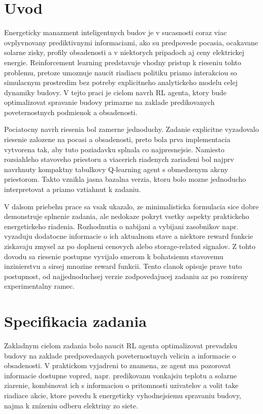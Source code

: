 \documentclass[conference]{IEEEtran}
\begin{document}
\section{Uvod}
Energeticky manazment inteligentnych budov je v sucasnosti coraz viac ovplyvnovany prediktivnymi informaciami, ako su predpovede pocasia, ocakavane solarne zisky, profily obsadenosti a v niektorych pripadoch aj ceny elektrickej energie. Reinforcement learning predstavuje vhodny pristup k rieseniu tohto problemu, pretoze umoznuje naucit riadiacu politiku priamo interakciou so simulacnym prostredim bez potreby explicitneho analytickeho modelu celej dynamiky budovy. V tejto praci je cielom navrh RL agenta, ktory bude optimalizovat spravanie budovy primarne na zaklade predikovanych poveternostnych podmienok a obsadenosti.

Pociatocny navrh riesenia bol zamerne jednoduchy. Zadanie explicitne vyzadovalo riesenie zalozene na pocasi a obsadenosti, preto bola prva implementacia vytvorena tak, aby tuto poziadavku splnala co najpresnejsie. Namiesto rozsiahleho stavoveho priestoru a viacerich riadenych zariadeni bol najprv navrhnuty kompaktny tabulkovy Q-learning agent s obmedzenym akcny priestorom. Takto vznikla jasna bazalna verzia, ktoru bolo mozne jednoducho interpretovat a priamo vztiahnut k zadaniu.

V dalsom priebehu prace sa vsak ukazalo, ze minimalisticka formulacia sice dobre demonstruje splnenie zadania, ale nedokaze pokryt vsetky aspekty praktickeho energetickeho riadenia. Rozhodnutia o nabijani a vybijani zasobnikov napr. vyzaduju dodatocne informacie o ich aktualnom stave a niektore reward funkcie ziskavaju zmysel az po doplneni cenovych alebo storage-related signalov. Z tohto dovodu sa riesenie postupne vyvijalo smerom k bohatsiemu stavovemu inzinierstvu a sirsej mnozine reward funkcii. Tento clanok opisuje prave tuto postupnost, od najjednoduchsej verzie zodpovedajucej zadaniu az po rozsireny experimentalny ramec.

\section{Specifikacia zadania}
Zakladnym cielom zadania bolo naucit RL agenta optimalizovat prevadzku budovy na zaklade predpovedanych poveternostnych velicin a informacie o obsadenosti. V praktickom vyjadreni to znamena, ze agent ma pozorovat informacie dostupne vopred, napr. predikovanu vonkajsiu teplotu a solarne ziarenie, kombinovat ich s informaciou o pritomnosti uzivatelov a volit take riadiace akcie, ktore povedu k energeticky vyhodnejsiemu spravaniu budovy, najma k znízeniu odberu elektriny zo siete.
\end{document}
